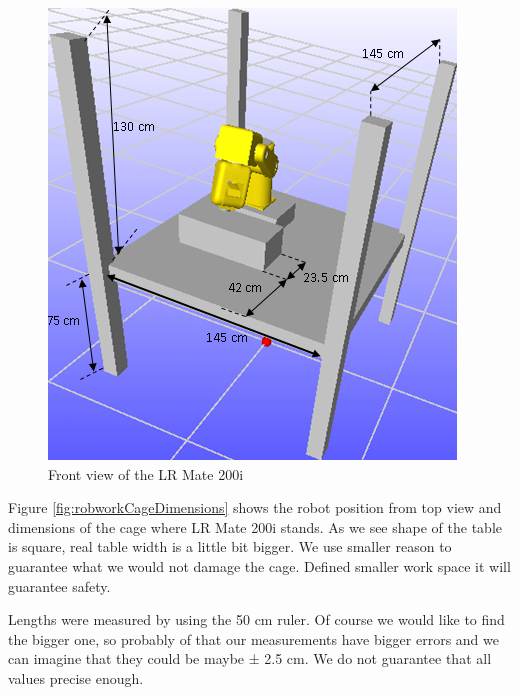 \begin{figure}[H]
  \centering
  \includegraphics[scale= 0.7]{source/robworkCage.png}
  \caption{Front view of the LR Mate 200i}
  \label{fig:robworkCage}
\end{figure}

Figure \ref{fig:robworkCageDimensions} shows the robot position from top view and dimensions of the cage where LR Mate 200i stands. As we see shape of the table is square, real table width is a little bit bigger. We use smaller reason to guarantee what we would not damage the cage. Defined smaller work space it will guarantee safety.\newline

Lengths were measured by using the 50 cm ruler. Of course we would like to find the bigger one, so probably of that our measurements have bigger errors and we can imagine that they could be maybe ± 2.5 cm. We do not guarantee that all values precise enough.

